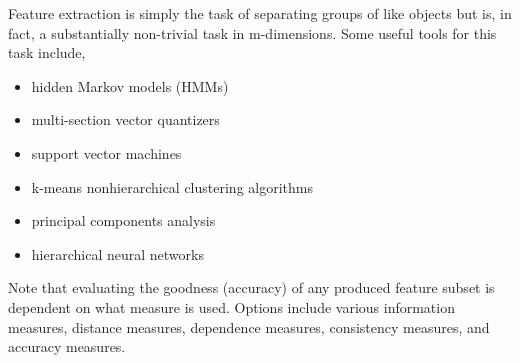 \documentclass[12pt]{article}
\begin{document}
\newpage

Feature extraction is simply the task of separating groups of like objects but is, in fact, a substantially non-trivial task in m-dimensions. Some useful tools for this task include,
\begin{itemize}
 	\item hidden Markov models (HMMs)
 	\item multi-section vector quantizers
 	\item support vector machines
 	\item k-means nonhierarchical clustering algorithms
 	\item principal components analysis
 	\item hierarchical neural networks
 \end{itemize} 

Note that evaluating the goodness (accuracy) of any produced feature subset is dependent on what measure is used. Options include various information measures, distance measures, dependence measures, consistency measures, and accuracy measures.


%
%
\end{document}
